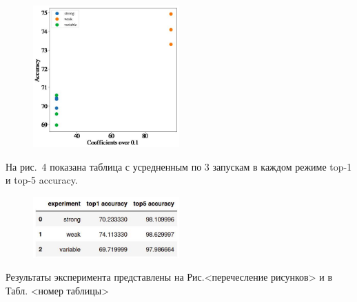 \documentclass[12pt,twoside]{article}
\begin{document}
\begin{figure}[!htbp]
	\centering
	\includegraphics[width=0.5\textwidth]{accuracy}
	\caption{}
	\label{}
\end{figure}

На рис.~4 показана таблица с усредненным по 3 запускам в каждом режиме top-1 и top-5 accuracy.

\begin{figure}[!htbp]
	\centering
	\includegraphics[width=0.5\textwidth]{accuracy_table}
	\caption{}
	\label{}
\end{figure}

Результаты эксперимента представлены на Рис.<перечесление рисунков> и в Табл. <номер таблицы> \\
  
  
  


\end{document}
